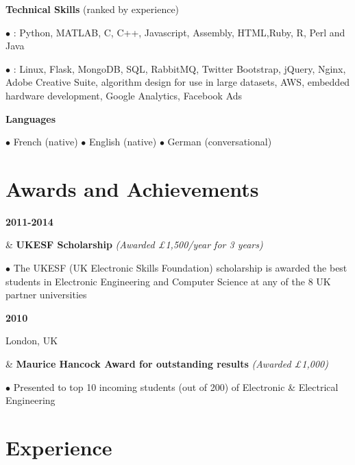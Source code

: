 \documentclass[a4paper,10pt,oneside]{article}
\begin{document}
\begin{flushleft}
	\vspace{-0.8em}
	
	
	\hspace{1em} \textbf{Technical Skills} (ranked by experience)
	
	\hspace{2em} $\bullet$ \underline{}: Python, MATLAB, C, C++, Javascript, Assembly, HTML,Ruby, R, Perl and Java
	
	\hspace{2em} \parbox{0.95\textwidth}{$\bullet$ \underline{}: Linux, Flask, MongoDB, SQL, RabbitMQ, Twitter Bootstrap, jQuery, Nginx, Adobe Creative Suite,  algorithm design for use in large datasets, AWS, embedded hardware development, Google Analytics, Facebook Ads}
	
	\hspace{1em} \textbf{Languages}
	
	\hspace{2em} $\bullet$ French (native) $\bullet$ English (native) $\bullet$ German (conversational)
	
\end{flushleft}

\section*{Awards and Achievements}

\begin{body}
{\textbf{2011-2014} \par {}} & \textbf{UKESF Scholarship} \textit{(Awarded £1,500/year for 3 years)}

$\bullet$ The UKESF (UK Electronic Skills Foundation) scholarship is awarded the best students in Electronic Engineering and Computer Science at any of the 8 UK partner universities
\\
{\textbf{2010} \par London, UK} & \textbf{Maurice Hancock Award for outstanding results} \textit{(Awarded £1,000)}

$\bullet$ Presented to top 10 incoming students (out of 200) of Electronic \& Electrical Engineering

\end{body}

\section*{Experience}
\end{document}
